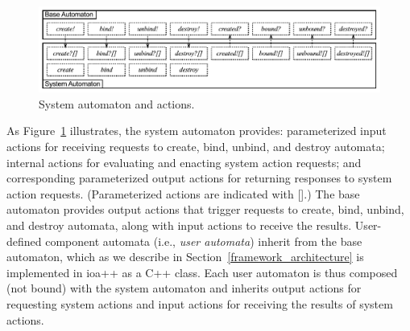 \begin{figure}
\center
\includegraphics[width=\textwidth]{system_action}
\caption{System automaton and actions.}
\label{system_action}
\end{figure}
As Figure~\ref{system_action} illustrates, the system automaton provides: parameterized input actions for receiving requests to create, bind, unbind, and destroy automata; internal actions for evaluating and enacting system action requests; and corresponding parameterized output actions for returning responses to system action requests.
(Parameterized actions are indicated with [].)
The base automaton provides output actions that trigger requests to create, bind, unbind, and destroy automata, along with
input actions to receive the results.
User-defined component automata (i.e., \emph{user automata}) inherit from the base automaton, which as we describe in Section~\ref{framework_architecture} is implemented in ioa++ as a C++ class. 
Each user automaton is thus composed (not bound) with the system automaton and inherits output actions for requesting system actions and input actions for receiving the results of system actions.

